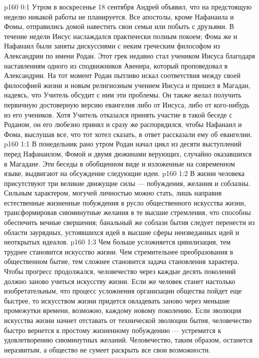 \author{Комиссия срединников}
\vs p160 0:1 Утром в воскресенье 18 сентября Андрей объявил, что на предстоящую неделю никакой работы не планируется. Все апостолы, кроме Нафанаила и Фомы, отправились домой навестить свои семьи или побыть с друзьями. В течение недели Иисус наслаждался практически полным покоем; Фома же и Нафанаил были заняты дискуссиями с неким греческим философом из Александрии по имени Родан. Этот грек недавно стал учеником Иисуса благодаря наставлениям одного из сподвижников Авенира, который проповедовал в Александрии. На тот момент Родан пытливо искал соответствия между своей философией жизни и новым религиозным учением Иисуса и пришел в Магадан, надеясь, что Учитель обсудит с ним эти проблемы. Он также желал получить первичную достоверную версию евангелия либо от Иисуса, либо от кого\hyp{}нибудь из его учеников. Хотя Учитель отказался принять участие в такой беседе с Роданом, он его любезно принял и сразу же распорядился, чтобы Нафанаил и Фома, выслушав все, что тот хотел сказать, в ответ рассказали ему об евангелии.
\vs p160 1:1 В понедельник рано утром Родан начал цикл из десяти выступлений перед Нафанаилом, Фомой и двумя дюжинами верующих, случайно оказавшихся в Магадане. Эти беседы в обобщенном виде и изложенные на современном языке, выдвигают на обсуждение следующие идеи.
\vs p160 1:2 \pc В жизни человека присутствуют три великие движущие силы --- побуждения, желания и соблазны. Сильным характером, могучей личностью можно стать, лишь направив естественные жизненные побуждения в русло общественного искусства жизни, трансформировав сиюминутные желания в те высшие стремления, что способны обеспечить вечные свершения; банальный же соблазн бытия следует перенести из области заурядных, устоявшихся идей в высшие сферы неизведанных идей и неоткрытых идеалов.
\vs p160 1:3 Чем больше усложняется цивилизация, тем труднее становится искусство жизни. Чем стремительнее преобразования в общественном бытие, тем сложнее становится задача становления характера. Чтобы прогресс продолжался, человечество через каждые десять поколений должно заново учиться искусству жизни. Если же человек станет настолько изобретательным, что процесс усложнения организации общества пойдет еще быстрее, то искусством жизни придется овладевать заново через меньшие промежутки времени, возможно, каждому новому поколению. Если эволюция искусства жизни начнет отставать от технической эволюции бытия, человечество быстро вернется к простому жизненному побуждению --- устремится к удовлетворению сиюминутных желаний. Человечество, таким образом, останется неразвитым, а общество не сумеет раскрыть все свои возможности.
